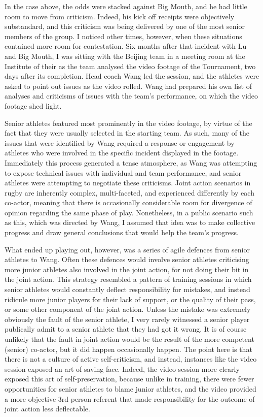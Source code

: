 \begin{CJK}{UTF8}{gbsn}
  In the case above, the odds were stacked against Big Mouth, and he had little room to move from criticism.  Indeed, his kick off receipts were objectively substandard, and this criticism was being delivered by one of the most senior members of the group.  I noticed other times, however, when these situations contained more room for contestation.  Six months after that incident with Lu and Big Mouth, I was sitting with the Beijing team in a meeting room at the Institute of their as the team analysed the video footage of the Tournament, two days after its completion.  Head coach Wang led the session, and the athletes were asked to point out issues as the video rolled. Wang had prepared his own list of analyses and criticisms of issues with the team's performance, on which the video footage shed light.

  Senior athletes featured most prominently in the video footage, by virtue of the fact that they were usually selected in the starting team.  As such, many of the issues that were identified by Wang required a response or engagement by athletes who were involved in the specific incident displayed in the footage. Immediately this process generated a tense atmosphere, as Wang was attempting to expose technical issues with individual and team performance, and senior athletes were attempting to negotiate these criticisms.  Joint action scenarios in rugby are inherently complex, multi-faceted, and experienced differently by each co-actor, meaning that there is occasionally considerable room for divergence of opinion regarding the same phase of play. Nonetheless, in a public scenario such as this, which was directed by Wang, I assumed that idea was to make collective progress and draw general conclusions that would help the team's progress.

  What ended up playing out, however, was a series of agile defences from senior athletes to Wang.  Often these defences would involve senior athletes criticising more junior athletes also involved in the joint action, for not doing their bit in the joint action.  This strategy resembled a pattern of training sessions in which senior athletes would constantly deflect responsibility for mistakes, and instead ridicule more junior players for their lack of support, or the quality of their pass, or some other component of the joint action. Unless the mistake was extremely obviously the fault of the senior athlete, I very rarely witnessed a senior player publically admit to a senior athlete that they had got it wrong. It is of course unlikely that the fault in joint action would be the result of the more competent (senior) co-actor, but it did happen occasionally happen.  The point here is that there is not a culture of active self-criticism, and instead, instances like the video session exposed an art of saving face.  Indeed, the video session more clearly exposed this art of self-preservation, because unlike in training, there were fewer opportunities for senior athletes to blame junior athletes, and the video provided a more objective 3rd person referent that made responsibility for the outcome of joint action less deflectable.


\end{CJK}
